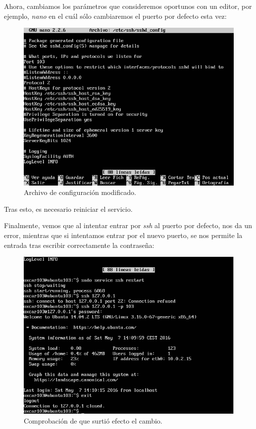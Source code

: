 \documentclass[paper=a4, fontsize=11pt]{scrartcl} %
\numberwithin{equation}{section} %
\numberwithin{figure}{section} %
\numberwithin{table}{section} %
\begin{document}
\begin{enumerate}
		Ahora, cambiamos los parámetros que consideremos oportunos con un editor, por ejemplo,
		\textit{nano}\cite{man_nano} en el cuál sólo cambiaremos el puerto por defecto esta vez:
		
		\begin{figure}[H]
			\centering
			\includegraphics[width=15cm]{Ejercicio_9b.jpg}
			\caption{Archivo de configuración modificado.}
			\label{fig:edit}	
		\end{figure}
		
		Tras esto, es necesario reiniciar el servicio.
		
		Finalmente, vemos que al intentar entrar por \textit{ssh} al puerto por defecto, nos da un
		error, mientras que si intentamos entrar por el nuevo puerto, se nos permite la entrada tras
		escribir correctamente la contraseña:
		
		\begin{figure}[H]
			\centering
			\includegraphics[width=15cm]{Ejercicio_9c.jpg}
			\caption{Comprobación de que surtió efecto el cambio.}
			\label{fig:after}	
		\end{figure}
		

\end{enumerate}
\end{document}
